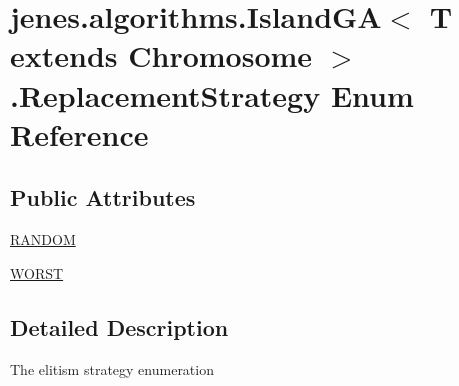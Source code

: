 \hypertarget{enumjenes_1_1algorithms_1_1_island_g_a_3_01_t_01extends_01_chromosome_01_4_1_1_replacement_strategy}{\section{jenes.\-algorithms.\-Island\-G\-A$<$ T extends Chromosome $>$.Replacement\-Strategy Enum Reference}
\label{enumjenes_1_1algorithms_1_1_island_g_a_3_01_t_01extends_01_chromosome_01_4_1_1_replacement_strategy}
}
\subsection*{Public Attributes}
\begin{DoxyCompactItemize}
\item 
\hyperlink{enumjenes_1_1algorithms_1_1_island_g_a_3_01_t_01extends_01_chromosome_01_4_1_1_replacement_strategy_a6025e6cfd088378ce15be8299d4d01a3}{R\-A\-N\-D\-O\-M}
\item 
\hyperlink{enumjenes_1_1algorithms_1_1_island_g_a_3_01_t_01extends_01_chromosome_01_4_1_1_replacement_strategy_a7c1f4683ed158cfaf0d6e21ce739bdea}{W\-O\-R\-S\-T}
\end{DoxyCompactItemize}


\subsection{Detailed Description}
The elitism strategy enumeration 

